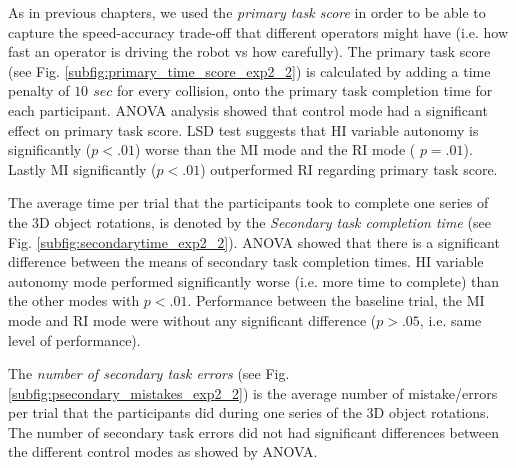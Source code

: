 \documentclass[a4paper,12pt,oneside,openright]{bhamthesis}
\begin{document}
As in previous chapters, we used the \textit{primary task score} in order to be able to capture the speed-accuracy trade-off that different operators might have (i.e. how fast an operator is driving the robot vs how carefully). The primary task score (see Fig. \ref{subfig:primary_time_score_exp2_2}) is calculated by adding a time penalty of \textit{$10$ $sec$} for every collision, onto the primary task completion time for each participant. ANOVA analysis showed that control mode had a significant effect on primary task score. LSD test suggests that HI variable autonomy is significantly (\textit{$p <.01$}) worse than the MI mode and the RI mode ( \textit{$p =.01$}). Lastly MI significantly (\textit{$p <.01$}) outperformed RI regarding primary task score. 

The average time per trial that the participants took to complete one series of the 3D object rotations, is denoted by the \textit{Secondary task completion time} (see Fig. \ref{subfig:secondarytime_exp2_2}). ANOVA showed that there is a significant difference between the means of secondary task completion times. HI variable autonomy mode performed significantly worse (i.e. more time to complete) than the other modes with $p < .01$. Performance between the baseline trial, the MI mode and RI mode were without any significant difference ($p > .05$, i.e. same level of performance).

The \textit{number of secondary task errors} (see Fig. \ref{subfig:psecondary_mistakes_exp2_2}) is the average number of mistake/errors per trial that the participants did during one series of the 3D object rotations. The number of secondary task errors did not had significant differences between the different control modes as showed by ANOVA.
\end{document}
